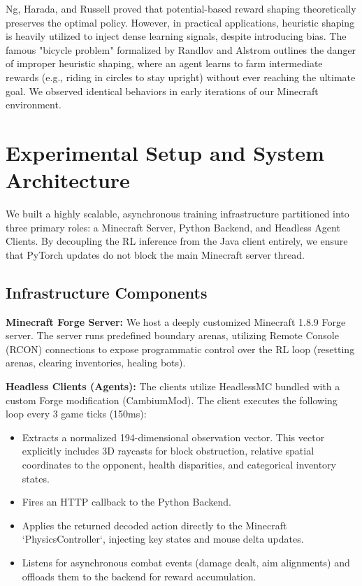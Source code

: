 \documentclass[conference]{IEEEtran}
\begin{document}
Ng, Harada, and Russell \cite{ng1999policy} proved that potential-based reward shaping theoretically preserves the optimal policy. However, in practical applications, heuristic shaping is heavily utilized to inject dense learning signals, despite introducing bias. The famous "bicycle problem" formalized by Randlov and Alstrom \cite{randlov1998learning} outlines the danger of improper heuristic shaping, where an agent learns to farm intermediate rewards (e.g., riding in circles to stay upright) without ever reaching the ultimate goal. We observed identical behaviors in early iterations of our Minecraft environment.

\section{Experimental Setup and System Architecture}
We built a highly scalable, asynchronous training infrastructure partitioned into three primary roles: a Minecraft Server, Python Backend, and Headless Agent Clients. By decoupling the RL inference from the Java client entirely, we ensure that PyTorch updates do not block the main Minecraft server thread.

\subsection{Infrastructure Components}
\textbf{Minecraft Forge Server:} We host a deeply customized Minecraft 1.8.9 Forge server. The server runs predefined boundary arenas, utilizing Remote Console (RCON) connections to expose programmatic control over the RL loop (resetting arenas, clearing inventories, healing bots).

\textbf{Headless Clients (Agents):} The clients utilize HeadlessMC bundled with a custom Forge modification (CambiumMod). The client executes the following loop every 3 game ticks (150ms):
\begin{itemize}
    \item Extracts a normalized 194-dimensional observation vector. This vector explicitly includes 3D raycasts for block obstruction, relative spatial coordinates to the opponent, health disparities, and categorical inventory states.
    \item Fires an HTTP callback to the Python Backend.
    \item Applies the returned decoded action directly to the Minecraft `PhysicsController`, injecting key states and mouse delta updates.
    \item Listens for asynchronous combat events (damage dealt, aim alignments) and offloads them to the backend for reward accumulation.
\end{itemize}
\end{document}
